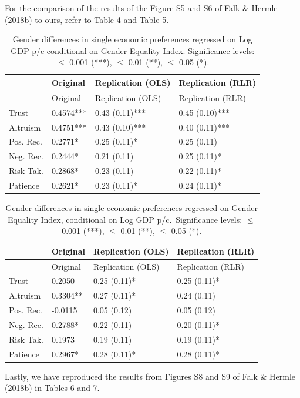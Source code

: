 \documentclass[
]{article}
\begin{document}
For the comparison of the results of the Figure S5 and S6 of Falk \&
Hermle (2018b) to ours, refer to Table 4 and Table 5.

\begin{longtable}[]{@{}llll@{}}
\caption{Gender differences in single economic preferences regressed on
Log GDP p/c conditional on Gender Equality Index. Significance levels:
\(\le\) 0.001 (***), \(\le\) 0.01 (**), \(\le\) 0.05
(*).}\tabularnewline
\toprule()
& Original & Replication (OLS) & Replication (RLR) \\
\midrule()
\endfirsthead
\toprule()
& Original & Replication (OLS) & Replication (RLR) \\
\midrule()
\endhead
Trust & 0.4574*** & 0.43 (0.11)*** & 0.45 (0.10)*** \\
Altruism & 0.4751*** & 0.43 (0.10)*** & 0.40 (0.11)*** \\
Pos. Rec. & 0.2771* & 0.25 (0.11)* & 0.25 (0.11) \\
Neg. Rec. & 0.2444* & 0.21 (0.11) & 0.25 (0.11)* \\
Risk Tak. & 0.2868* & 0.23 (0.11) & 0.22 (0.11)* \\
Patience & 0.2621* & 0.23 (0.11)* & 0.24 (0.11)* \\
\bottomrule()
\end{longtable}

\begin{longtable}[]{@{}llll@{}}
\caption{Gender differences in single economic preferences regressed on
Gender Equality Index, conditional on Log GDP p/c.~Significance levels:
\(\le\) 0.001 (***), \(\le\) 0.01 (**), \(\le\) 0.05
(*).}\tabularnewline
\toprule()
& Original & Replication (OLS) & Replication (RLR) \\
\midrule()
\endfirsthead
\toprule()
& Original & Replication (OLS) & Replication (RLR) \\
\midrule()
\endhead
Trust & 0.2050 & 0.25 (0.11)* & 0.25 (0.11)* \\
Altruism & 0.3304** & 0.27 (0.11)* & 0.24 (0.11) \\
Pos. Rec. & -0.0115 & 0.05 (0.12) & 0.05 (0.12) \\
Neg. Rec. & 0.2788* & 0.22 (0.11) & 0.20 (0.11)* \\
Risk Tak. & 0.1973 & 0.19 (0.11) & 0.19 (0.11)* \\
Patience & 0.2967* & 0.28 (0.11)* & 0.28 (0.11)* \\
\bottomrule()
\end{longtable}

Lastly, we have reproduced the results from Figures S8 and S9 of Falk \&
Hermle (2018b) in Tables 6 and 7.
\end{document}
